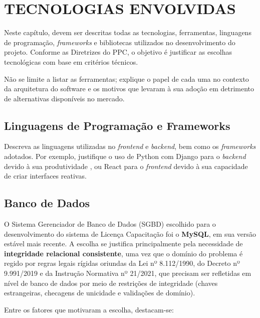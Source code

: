 \chapter{TECNOLOGIAS ENVOLVIDAS}
\label{cap:tecnologias}

Neste capítulo, devem ser descritas todas as tecnologias, ferramentas, linguagens de programação, \textit{frameworks} e bibliotecas utilizados no desenvolvimento do projeto. Conforme as Diretrizes do PPC, o objetivo é justificar as escolhas tecnológicas com base em critérios técnicos.

Não se limite a listar as ferramentas; explique o papel de cada uma no contexto da arquitetura do software e os motivos que levaram à sua adoção em detrimento de alternativas disponíveis no mercado.

\section{Linguagens de Programação e Frameworks}

Descreva as linguagens utilizadas no \textit{frontend} e \textit{backend}, bem como os \textit{frameworks} adotados. Por exemplo, justifique o uso de Python com Django para o \textit{backend} devido à sua produtividade \cite{django_docs}, ou React para o \textit{frontend} devido à sua capacidade de criar interfaces reativas.

\section{Banco de Dados}

O Sistema Gerenciador de Banco de Dados (SGBD) escolhido para o desenvolvimento do sistema de Licença Capacitação foi o \textbf{MySQL}, em sua versão estável mais recente. A escolha se justifica principalmente pela necessidade de \textbf{integridade relacional consistente}, uma vez que o domínio do problema é regido por regras legais rígidas oriundas da Lei nº 8.112/1990, do Decreto nº 9.991/2019 e da Instrução Normativa nº 21/2021, que precisam ser refletidas em nível de banco de dados por meio de restrições de integridade (chaves estrangeiras, checagens de unicidade e validações de domínio).

Entre os fatores que motivaram a escolha, destacam-se:

